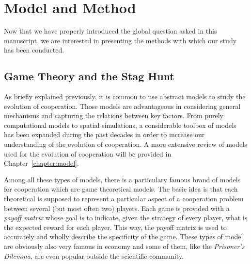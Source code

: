 



\section{Model and Method}

  Now that we have properly introduced the global question asked in this manuscript, we are interested in presenting the methods with which our study has been conducted.
  
  \subsection{Game Theory and the Stag Hunt}

    As briefly explained previously, it is common to use abstract models to study the evolution of cooperation. Those models are advantageous in considering general mechanisms and capturing the relations between key factors. From purely computational models to spatial simulations, a considerable toolbox of models has been expanded during the past decades in order to increase our understanding of the evolution of cooperation. A more extensive review of models used for the evolution of cooperation will be provided in Chapter~\ref{chapter:model}.

    Among all these types of models, there is a particulary famous brand of models for cooperation which are game theoretical models. The basic idea is that each theoretical is supposed to represent a particular aspect of a cooperation problem between several (but most often two) players. Each game is provided with a \emph{payoff matrix} whose goal is to indicate, given the strategy of every player, what is the expected reward for each player. This way, the payoff matrix is used to accurately and wholly describe the specificity of the game. These types of model are obviously also very famous in economy and some of them, like the \emph{Prisoner's Dilemma}, are even popular outside the scientific community.

